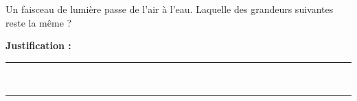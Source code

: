 Un faisceau de lumière passe de l'air à l'eau. Laquelle des grandeurs suivantes reste la même ?

\choices

\noindent\textbf{Justification :} \hrulefill \\[2.5ex]
\rule{\linewidth}{0.4pt} \\[2.5ex]
\rule{\linewidth}{0.4pt}
\vfill
